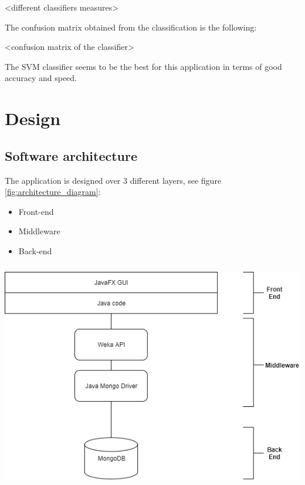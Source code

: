 \documentclass[a4paper, oneside]{article}
\begin{document}
<different classifiers measures>

The confusion matrix obtained from the classification is the following:

<confusion matrix of the classifier>

The SVM classifier seems to be the best for this application in terms of good accuracy and speed.



\clearpage
\section{Design}

\subsection{Software architecture}
The application is designed over 3 different layers, see figure \ref{fig:architecture_diagram}:
\begin{itemize}
\item Front-end
\item Middleware
\item Back-end
\end{itemize}
\vspace{5mm}
\begin{minipage}{\linewidth}
\begin{center}
\vspace{1mm}
\includegraphics[height = 100mm]{./images/diagrams/architecture} 
\vspace{6mm}
\label{fig:architecture_diagram}
\end{center}
\end{minipage}
\vspace{7mm}
\clearpage
\end{document}
